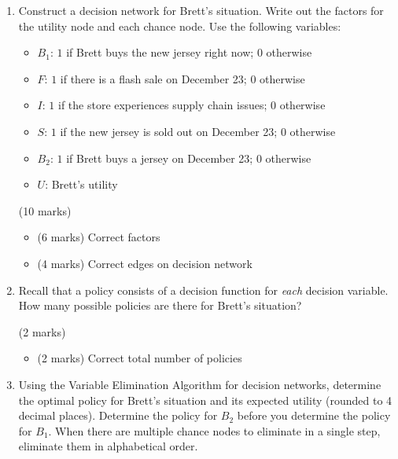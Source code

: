 \documentclass[12pt]{article}
\begin{document}
\begin{enumerate}[font=\Large,label=(\alph*)]
    
    \item Construct a decision network for Brett's situation. Write out the factors for the utility node and each chance node. Use the following variables:
    \begin{itemize}
        \item $B_1$: $1$ if Brett buys the new jersey right now; $0$ otherwise
        \item $F$: $1$ if there is a flash sale on December 23; $0$ otherwise
        \item $I$: $1$ if the store experiences supply chain issues; $0$ otherwise
        \item $S$: $1$ if the new jersey is sold out on December 23; $0$ otherwise
        \item $B_2$: $1$ if Brett buys a jersey on December 23; $0$ otherwise
        \item $U$: Brett's utility
    \end{itemize}
    
    
    \begin{markscheme}
    (10 marks)
    
    \begin{itemize}
        \item (6 marks) Correct factors
        \item (4 marks) Correct edges on decision network
    \end{itemize}
    
    \end{markscheme}
    
    \item Recall that a policy consists of a decision function for {\it each} decision variable. How many possible policies are there for Brett's situation?
    
    \begin{markscheme}
    (2 marks)
    
    \begin{itemize}
        \item (2 marks) Correct total number of policies
    \end{itemize}
    
    \end{markscheme}
    
    
    \item Using the Variable Elimination Algorithm for decision networks, determine the optimal policy for Brett's situation and its expected utility (rounded to 4 decimal places). Determine the policy for $B_2$ before you determine the policy for $B_1$. When there are multiple chance nodes to eliminate in a single step, eliminate them in alphabetical order.
    

\end{enumerate}
\end{document}

